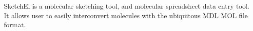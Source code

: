 SketchEl is a molecular sketching tool, and molecular spreadsheet data entry tool. It allows user to easily interconvert molecules with the ubiquitous MDL MOL file format. 